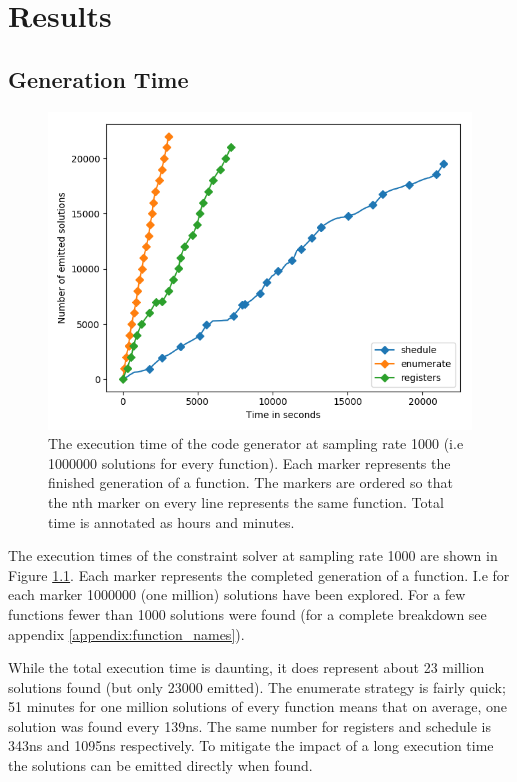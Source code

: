 \chapter{Results}

\section{Generation Time}

\begin{figure}[h]
	\centering
	\includegraphics[width=\textwidth,height=0.5\textheight]{results/figures/generator_time}
	\caption{The execution time of the code generator at sampling rate 1000 (i.e 1000000 solutions for every function). Each marker represents the finished generation of a function. The markers are ordered so that the nth marker on every line represents the same function. Total time is annotated as hours and minutes.}
	\label{fig:time}
\end{figure}

The execution times of the constraint solver at sampling rate 1000 are shown in Figure
\ref{fig:time}. Each marker represents the completed generation of a function. I.e for each
marker 1000000 (one million) solutions have been explored. For a few functions fewer than
1000 solutions were found (for a complete breakdown see appendix \ref{appendix:function_names}).

While the total execution time is daunting, it does represent about 23 million solutions
found (but only 23000 emitted). The enumerate strategy is fairly quick; 51 minutes for one
million solutions of every function means that on average, one solution was found every
139ns. The same number for registers and schedule is 343ns and 1095ns respectively. To
mitigate the impact of a long execution time the solutions can be emitted directly when
found.

